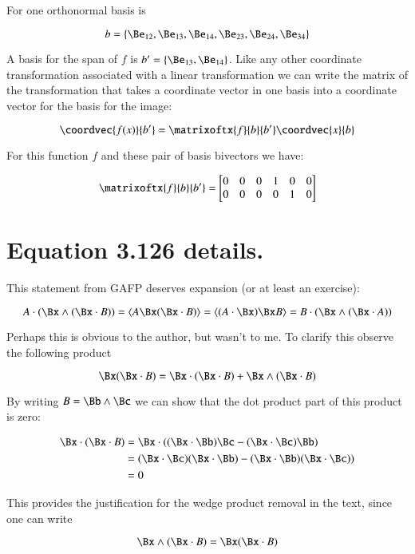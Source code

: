 For  one orthonormal basis is

\[
b = \{ 
\Be_{12},
\Be_{13},
\Be_{14},
\Be_{23},
\Be_{24},
\Be_{34}
\}
\]

A basis for the span of $f$ is $b' = \{
\Be_{13},
\Be_{14}
\}$.  Like any other coordinate transformation associated with a linear transformation we can write the matrix of the transformation that
takes a coordinate vector in one basis into a coordinate vector for the basis for the image:

\[
\coordvec{f(x)}{b'}
=
\matrixoftx{f}{b}{b'}
\coordvec{x}{b}
\] 

For this function $f$ and these pair of basis bivectors we have:

\[
\matrixoftx{f}{b}{b'}
= 
\begin{bmatrix}
0 & 0 & 0 & 1 & 0 & 0 \\
0 & 0 & 0 & 0 & 1 & 0 \\
\end{bmatrix}
\]

\section{Equation 3.126 details. }

This statement from GAFP deserves expansion (or at least an exercise):

\[
A \cdot ( \Bx \wedge (\Bx \cdot B) )
= \langle{A \Bx (\Bx \cdot B)}\rangle
= \langle (A \cdot \Bx) \Bx B \rangle
= B \cdot ( \Bx \wedge (\Bx \cdot A) )
\]

Perhaps this is obvious to the author, but wasn't to me.  To clarify this observe the following product

\[
\Bx ( \Bx \cdot B ) = \Bx \cdot ( \Bx \cdot B ) + \Bx \wedge ( \Bx \cdot B ) 
\]

By writing $B = \Bb \wedge \Bc$ we can show that the dot product part of this product is zero:

\begin{align*}
\Bx \cdot ( \Bx \cdot B ) 
&= \Bx \cdot ( (\Bx \cdot \Bb) \Bc - (\Bx \cdot \Bc) \Bb ) \\
&= (\Bx \cdot \Bc) (\Bx \cdot \Bb) - (\Bx \cdot \Bb) (\Bx \cdot \Bc)) \\
&= 0
\end{align*}

This provides the justification for the wedge product removal in the text, since
one can write

\begin{equation}
\Bx \wedge ( \Bx \cdot B ) = \Bx ( \Bx \cdot B )
\end{equation}\label{eqn:itensor:inertiaWedgeToProduct}

